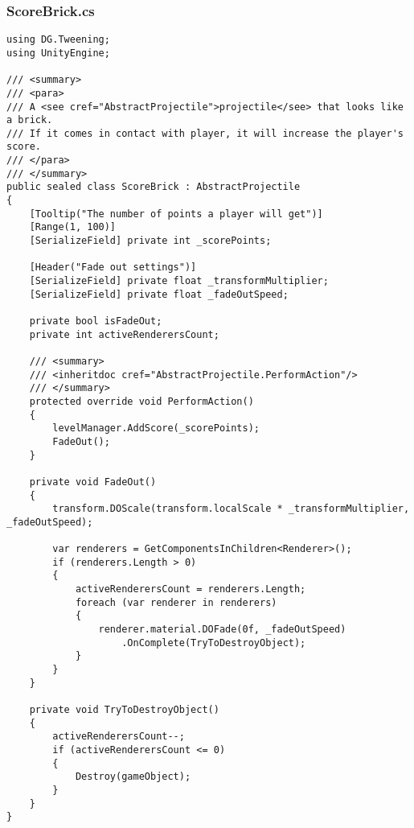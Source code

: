 \subsubsection*{ScoreBrick.cs}
\begin{verbatim}
using DG.Tweening;
using UnityEngine;

/// <summary>
/// <para>
/// A <see cref="AbstractProjectile">projectile</see> that looks like a brick.
/// If it comes in contact with player, it will increase the player's score.
/// </para>
/// </summary>
public sealed class ScoreBrick : AbstractProjectile
{
    [Tooltip("The number of points a player will get")]
    [Range(1, 100)]
    [SerializeField] private int _scorePoints;

    [Header("Fade out settings")]
    [SerializeField] private float _transformMultiplier;
    [SerializeField] private float _fadeOutSpeed;

    private bool isFadeOut;
    private int activeRenderersCount;

    /// <summary>
    /// <inheritdoc cref="AbstractProjectile.PerformAction"/>
    /// </summary>
    protected override void PerformAction()
    {
        levelManager.AddScore(_scorePoints);
        FadeOut();
    }

    private void FadeOut()
    {
        transform.DOScale(transform.localScale * _transformMultiplier, _fadeOutSpeed);

        var renderers = GetComponentsInChildren<Renderer>();
        if (renderers.Length > 0)
        {
            activeRenderersCount = renderers.Length;
            foreach (var renderer in renderers)
            {
                renderer.material.DOFade(0f, _fadeOutSpeed)
                    .OnComplete(TryToDestroyObject);
            }
        }
    }

    private void TryToDestroyObject()
    {
        activeRenderersCount--;
        if (activeRenderersCount <= 0)
        {
            Destroy(gameObject);
        }
    }
}
\end{verbatim}
